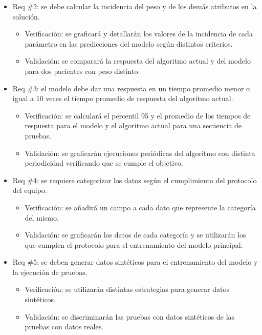 \documentclass[
11pt, %
]{charter}
\begin{document}
\begin{itemize} 
	\item Req \#2: se debe calcular la incidencia del peso y de los demás atributos en la solución.
	
	\begin{itemize}
		\item Verificación: se graficará y detallarán los valores de la incidencia de cada parámetro en las predicciones del modelo según distintos criterios.
		\item Validación: se comparará la respuesta del algoritmo actual y del modelo para dos pacientes con peso distinto.
	\end{itemize}
	
\end{itemize}

\begin{itemize} 
	\item Req \#3: el modelo debe dar una respuesta en un tiempo promedio menor o igual a 10 veces el tiempo promedio de respuesta del algoritmo actual.
	
	\begin{itemize}
		\item Verificación: se calculará el percentil 95 y el promedio de los tiempos de respuesta para el modelo y el algoritmo actual para una secuencia de pruebas.
		\item Validación: se graficarán ejecuciones periódicas del algoritmo con distinta periodicidad verificando que se cumple el objetivo.
	\end{itemize}
	
\end{itemize}

\begin{itemize} 
	\item Req \#4: se requiere categorizar los datos según el cumplimiento del protocolo del equipo.
	
	\begin{itemize}
		\item Verificación: se añadirá un campo a cada dato que represente la categoría del mismo.
		\item Validación: se graficarán los datos de cada categoría y se utilizarán los que cumplen el protocolo para el entrenamiento del modelo principal.
	\end{itemize}
	
\end{itemize}

\begin{itemize} 
	\item Req \#5: se deben generar datos sintéticos para el entrenamiento del modelo y la ejecución de pruebas.
	
	\begin{itemize}
		\item Verificación: se utilizarán distintas estrategias para generar datos sintéticos.
		\item Validación: se discriminarán las pruebas con datos sintéticos de las pruebas con datos reales.
	\end{itemize}
	
\end{itemize}
\end{document}
